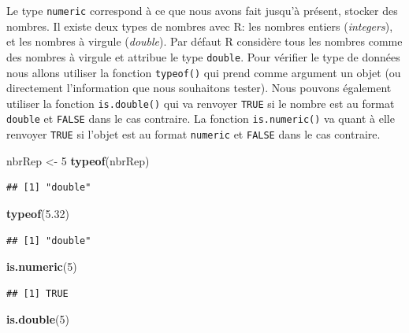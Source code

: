 \documentclass[twoside,symmetric]{book}
\newenvironment{Shaded}{}{}
\newcommand{\DecValTok}[1]{#1}
\newcommand{\FloatTok}[1]{#1}
\newcommand{\KeywordTok}[1]{\textbf{#1}}
\newcommand{\NormalTok}[1]{#1}
\newcommand{\StringTok}[1]{#1}
\begin{document}
Le type \texttt{numeric} correspond à ce que nous avons fait jusqu'à présent, stocker des nombres. Il existe deux types de nombres avec R: les nombres entiers (\emph{integers}), et les nombres à virgule (\emph{double}). Par défaut R considère tous les nombres comme des nombres à virgule et attribue le type \texttt{double}.
Pour vérifier le type de données nous allons utiliser la fonction \texttt{typeof()} qui prend comme argument un objet (ou directement l'information que nous souhaitons tester). Nous pouvons également utiliser la fonction \texttt{is.double()} qui va renvoyer \texttt{TRUE} si le nombre est au format \texttt{double} et \texttt{FALSE} dans le cas contraire. La fonction \texttt{is.numeric()} va quant à elle renvoyer \texttt{TRUE} si l'objet est au format \texttt{numeric} et \texttt{FALSE} dans le cas contraire.

\begin{Shaded}
\begin{Highlighting}[]
\NormalTok{nbrRep <-}\StringTok{ }\DecValTok{5}
\KeywordTok{typeof}\NormalTok{(nbrRep)}
\end{Highlighting}
\end{Shaded}

\begin{verbatim}
## [1] "double"
\end{verbatim}

\begin{Shaded}
\begin{Highlighting}[]
\KeywordTok{typeof}\NormalTok{(}\FloatTok{5.32}\NormalTok{)}
\end{Highlighting}
\end{Shaded}

\begin{verbatim}
## [1] "double"
\end{verbatim}

\begin{Shaded}
\begin{Highlighting}[]
\KeywordTok{is.numeric}\NormalTok{(}\DecValTok{5}\NormalTok{)}
\end{Highlighting}
\end{Shaded}

\begin{verbatim}
## [1] TRUE
\end{verbatim}

\begin{Shaded}
\begin{Highlighting}[]
\KeywordTok{is.double}\NormalTok{(}\DecValTok{5}\NormalTok{)}
\end{Highlighting}
\end{Shaded}
\end{document}
